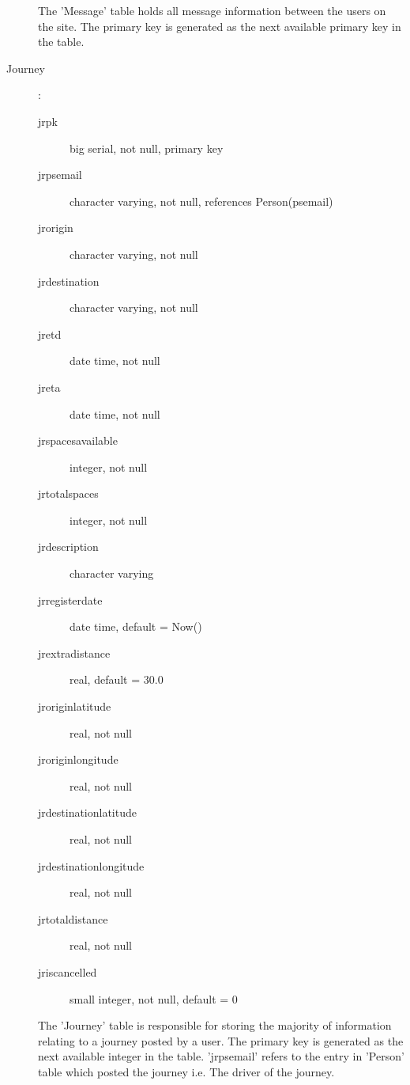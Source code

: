 \documentclass[11pt]{article}
\begin{document}
\begin{description}
The 'Message' table holds all message information between the users on the site. The primary key is generated as the next available primary key in the table.
	
\item[Journey]:

	\begin{description}
	\item[jr\textunderscore pk] big serial, not null, primary key
	\item[jr\textunderscore ps\textunderscore email] character varying, not null, references Person(ps\textunderscore email)
	\item[jr\textunderscore origin] character varying, not null
	\item[jr\textunderscore destination] character varying, not null
	\item[jr\textunderscore etd] date time, not null
	\item[jr\textunderscore eta] date time, not null
	\item[jr\textunderscore spaces\textunderscore available] integer, not null
	\item[jr\textunderscore total\textunderscore spaces] integer, not null
	\item[jr\textunderscore description] character varying
	\item[jr\textunderscore register\textunderscore date] date time, default = Now()
	\item[jr\textunderscore extra\textunderscore distance] real, default = 30.0
	\item[jr\textunderscore origin\textunderscore latitude] real, not null
	\item[jr\textunderscore origin\textunderscore longitude] real, not null
	\item[jr\textunderscore destination\textunderscore latitude] real, not null
	\item[jr\textunderscore destination\textunderscore longitude] real, not null
	\item[jr\textunderscore total\textunderscore distance] real, not null
	\item[jr\textunderscore is\textunderscore cancelled] small integer, not null, default = 0
	\end{description}
	
The 'Journey' table is responsible for storing the majority of information relating to a journey posted by a user. The primary key is generated as the next available integer in the table. 'jr\textunderscore ps\textunderscore email' refers to the entry in 'Person' table which posted the journey i.e. The driver of the journey.
	

\end{description}
\end{document}
